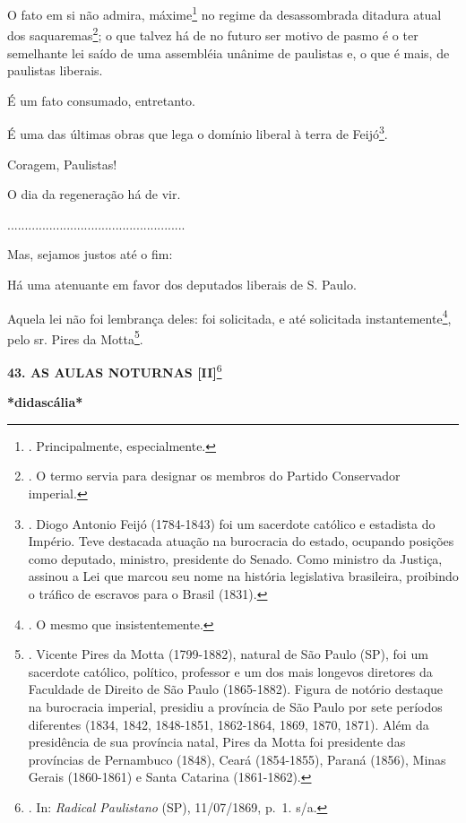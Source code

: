 O fato em si não admira, máxime\footnote{. Principalmente,
  especialmente.} no regime da desassombrada ditadura atual dos
saquaremas\footnote{. O termo servia para designar os membros do Partido
  Conservador imperial.}; o que talvez há de no futuro ser motivo de
pasmo é o ter semelhante lei saído de uma assembléia unânime de
paulistas e, o que é mais, de paulistas liberais.

É um fato consumado, entretanto.

É uma das últimas obras que lega o domínio liberal à terra de
Feijó\footnote{. Diogo Antonio Feijó (1784-1843) foi um sacerdote
  católico e estadista do Império. Teve destacada atuação na burocracia
  do estado, ocupando posições como deputado, ministro, presidente do
  Senado. Como ministro da Justiça, assinou a Lei que marcou seu nome na
  história legislativa brasileira, proibindo o tráfico de escravos para
  o Brasil (1831).}.

Coragem, Paulistas!

O dia da regeneração há de vir.

...................................................

Mas, sejamos justos até o fim:

Há uma atenuante em favor dos deputados liberais de S. Paulo.

Aquela lei não foi lembrança deles: foi solicitada, e até solicitada
instantemente\footnote{. O mesmo que insistentemente.}, pelo sr. Pires
da Motta\footnote{. Vicente Pires da Motta (1799-1882), natural de São
  Paulo (SP), foi um sacerdote católico, político, professor e um dos
  mais longevos diretores da Faculdade de Direito de São Paulo
  (1865-1882). Figura de notório destaque na burocracia imperial,
  presidiu a província de São Paulo por sete períodos diferentes (1834,
  1842, 1848-1851, 1862-1864, 1869, 1870, 1871). Além da presidência de
  sua província natal, Pires da Motta foi presidente das províncias de
  Pernambuco (1848), Ceará (1854-1855), Paraná (1856), Minas Gerais
  (1860-1861) e Santa Catarina (1861-1862).}.

\textbf{43. AS AULAS NOTURNAS {[}II{]}}\footnote{. In: \emph{Radical
  Paulistano} (SP), 11/07/1869, p.~1. s/a.}

\textbf{*didascália*}


